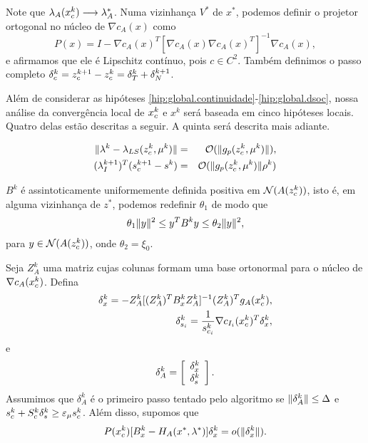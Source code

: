 Note que $\lambda_A(x_c^{k})\longrightarrow\lambda_A^*$.
 Numa vizinhança $V^*$ de $x^*$, podemos definir o projetor ortogonal no núcleo de $\nabla
 c_A(x)$ como $$P(x) = I - \nabla c_A(x)^T[\nabla c_A(x)\nabla c_A(x)^T]^{-1}\nabla c_A(x),$$ e
 afirmamos que ele é Lipschitz contínuo, pois $c \in C^2$. Também definimos o passo completo
 $\delta_c^k = z_c^{k+1}-z_c^{k} = \delta_T^k + \delta_N^{k+1}$.

Além de considerar as hipóteses \ref{hip:global.continuidade}-\ref{hip:global.dsoc}, nossa
 análise da convergência local de $x_c^{k}$ e $x^k$
 será baseada em cinco hipóteses locais. Quatro delas estão descritas a seguir.
 A quinta será descrita mais adiante.
\begin{hypoenv}
\begin{eqnarray*}
\Vert \lambda^{k} - \lambda_{LS}(z_c^{k},\mu^{k})\Vert & = & \mathcal{O}(\Vert g_p(z_c^{k},\mu^{k})\Vert), \\
  (\lambda^{k+1}_I)^T(s_c^{k+1} - s^k) & = & \mathcal{O}(\Vert g_p(z_c^{k},\mu^{k})\Vert\rho^k)
\end{eqnarray*}
\end{hypoenv}
\begin{hypoenv}
 $B^k$ é assintoticamente uniformemente definida positiva em $\mathcal{N}(A(z_c^{k}))$, isto é, em
alguma vizinhança de $z^*$, podemos redefinir $\theta_1$ de modo que
\begin{eqnarray}
 \theta_1\norma{y}^2 \leq y^TB^k y \leq \theta_2\norma{y}^2, \visiblelbl{eq:rayleigh}
\end{eqnarray}
para $y \in \mathcal{N}(A(z_c^{k}))$, onde $\theta_2 = \xi_0$.
\end{hypoenv}
\begin{hypoenv}
 Seja $Z_A^k$ uma matriz cujas colunas formam uma base ortonormal para o núcleo de
 $\nabla c_A(x_c^{k})$. Defina
\begin{eqnarray}
\delta_x^k = -Z_A^k[(Z_A^k)^T B_x^k Z_A^k]^{-1}(Z_A^k)^Tg_A(\xc{k}), \visiblelbl{eq:dhndefx} \\
\delta_{s_i}^k = \frac{1}{s_{c_i}^k}\nabla c_{I_i}(\xc{k})^T\delta_x^k, \visiblelbl{eq:dhndefs}
\end{eqnarray}
e
$$\delta_A^k = \left[\begin{array}{c}\delta_x^k \\ \delta_{s}^k\end{array}\right].$$
Assumimos que $\delta_A^k$ é o primeiro passo tentado pelo algoritmo se $\Vert \delta_A^k\Vert
 \leq \Delta$ e $s_c^k + S_c^k\delta_s^k \geq \varepsilon_{\mu} s_c^k$. Além disso, supomos que
\begin{eqnarray}
 P(x_c^{k})[B_x^k - H_A(x^*,\lambda^*)]\delta_x^k = o(\Vert \delta_x^k\Vert).
 \label{eq:proj_tangente}
\end{eqnarray}
\end{hypoenv}
